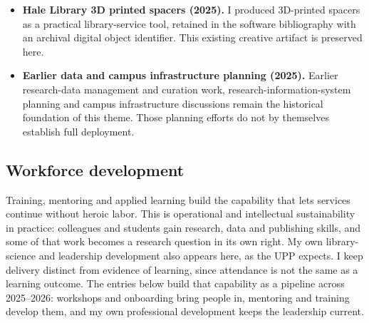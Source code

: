 \begin{itemize}
\item \textbf{Hale Library 3D printed spacers (2025).} I produced 3D-printed spacers as a practical library-service tool, retained in the software bibliography with an archival digital object identifier. This existing creative artifact is preserved here.
\item \textbf{Earlier data and campus infrastructure planning (2025).} Earlier research-data management and curation work, research-information-system planning and campus infrastructure discussions remain the historical foundation of this theme. Those planning efforts do not by themselves establish full deployment.
\end{itemize}

\subsection{Workforce development}
Training, mentoring and applied learning build the capability that lets services continue without heroic labor. This is operational and intellectual sustainability in practice: colleagues and students gain research, data and publishing skills, and some of that work becomes a research question in its own right. My own library-science and leadership development also appears here, as the UPP expects. I keep delivery distinct from evidence of learning, since attendance is not the same as a learning outcome. The entries below build that capability as a pipeline across 2025--2026: workshops and onboarding bring people in, mentoring and training develop them, and my own professional development keeps the leadership current.

